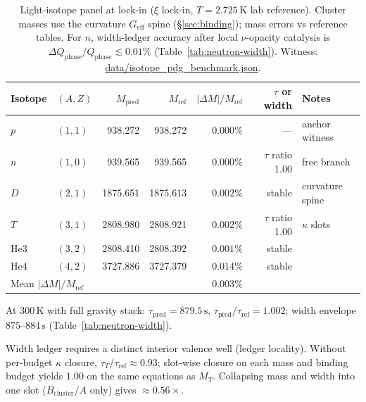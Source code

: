 \documentclass[11pt,notitlepage]{amsart}
\newcommand{\datafile}[1]{{\footnotesize\url{data/#1}}}
\begin{document}
\begin{table}[htbp]
\centering
\caption{Light-isotope panel at lock-in ($\xi$ lock-in, $T=2.725\,\mathrm{K}$ lab reference).
Cluster masses use the curvature $G_{\mathrm{eff}}$ spine (\S\ref{sec:binding});
mass errors vs reference tables. For $n$, width-ledger accuracy after local $\nu$-opacity
catalysis is $\Delta Q_{\mathrm{phase}}/Q_{\mathrm{phase}}\lesssim 0.01\%$
(Table~\ref{tab:neutron-width}). Witness:
\datafile{isotope_pdg_benchmark.json}.}
\label{tab:light-panel}
\begin{threeparttable}
\small
\setlength{\tabcolsep}{4pt}
\begin{tabular}{@{}llrrrrl@{}}
\toprule
Isotope & $(A,Z)$ & $M_{\mathrm{pred}}$ & $M_{\mathrm{ref}}$ & $|\Delta M|/M_{\mathrm{ref}}$ &
  $\tau$ or width & Notes \\
\midrule
$p$   & $(1,1)$ & 938.272 & 938.272 & $0.000\%$ & --- & anchor witness \\
$n$   & $(1,0)$ & 939.565 & 939.565 & $0.000\%$ & $\tau$ ratio 1.00\tnote{a} & free branch \\
$D$   & $(2,1)$ & 1875.651 & 1875.613 & $0.002\%$ & stable & curvature spine \\
$T$   & $(3,1)$ & 2808.980 & 2808.921 & $0.002\%$ & $\tau$ ratio 1.00\tnote{b} & $\kappa$ slots \\
$\mathrm{He3}$ & $(3,2)$ & 2808.410 & 2808.392 & $0.001\%$ & stable & \\
$\mathrm{He4}$ & $(4,2)$ & 3727.886 & 3727.379 & $0.014\%$ & stable & \\
\midrule
\multicolumn{4}{l}{Mean $|\Delta M|/M_{\mathrm{ref}}$} & $0.003\%$ & & \\
\bottomrule
\end{tabular}
\begin{tablenotes}
\small
\item[a] At $300\,\mathrm{K}$ with full gravity stack:
  $\tau_{\mathrm{pred}}=879.5\,\mathrm{s}$, $\tau_{\mathrm{pred}}/\tau_{\mathrm{ref}}=1.002$;
  width envelope $875$--$884\,\mathrm{s}$ (Table~\ref{tab:neutron-width}).
\item[b] Width ledger requires a distinct interior valence well (ledger locality).
  Without per-budget $\kappa$ closure, $\tau_T/\tau_{\mathrm{ref}}\approx 0.93$; slot-wise
  closure on each mass and binding budget yields $1.00$ on the same equations as $M_T$.
  Collapsing mass and width into one slot ($B_{\mathrm{cluster}}/A$ only) gives $\approx 0.56\times$.
\end{tablenotes}
\end{threeparttable}
\end{table}
\end{document}
